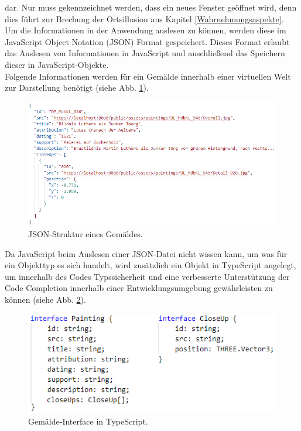 \documentclass[a4paper,12pt,oneside]{article}
\begin{document}
        dar. Nur muss gekennzeichnet werden, dass ein neues Fenster geöffnet wird,
        denn dies führt zur Brechung der Ortsillusion 
        aus Kapitel \ref{Wahrnehmungsaspekte}. \\        
        Um die Informationen in der Anwendung auslesen zu können, werden diese im
        JavaScript Object Notation (JSON) Format gespeichert. Dieses Format erlaubt das
        Auslesen von Informationen in JavaScript und anschließend das Speichern dieser
        in JavaScript-Objekte. \\
        Folgende Informationen werden für
        ein Gemälde innerhalb einer virtuellen Welt zur Darstellung benötigt
        (siehe Abb. \ref{fig:json-aufbau1}).
        \begin{figure}[h]
          \centering
          \includegraphics[scale=0.8]{img/coding/json-aufbau1.png}
          \caption{JSON-Struktur eines Gemäldes.}
          \label{fig:json-aufbau1}
        \end{figure}
        Da JavaScript beim Auslesen einer JSON-Datei nicht wissen kann,
        um was für ein Objekttyp es sich handelt, wird zusätzlich ein
        Objekt in TypeScript angelegt, um innerhalb des Codes Typssicherheit
        und eine verbesserte Unterstützung der Code Completion innerhalb
        einer Entwicklungsumgebung gewährleisten 
        zu können (siehe Abb. \ref{fig:painting-type1}). \\
        \begin{figure}[h]
          \centering
          \includegraphics{img/coding/painting-type1.png}
          \caption{Gemälde-Interface in TypeScript.}
          \label{fig:painting-type1}
        \end{figure}
\end{document}
